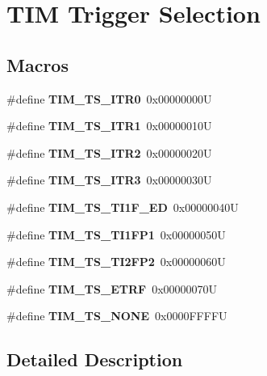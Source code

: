 \hypertarget{group___t_i_m___trigger___selection}{}\section{T\+IM Trigger Selection}
\label{group___t_i_m___trigger___selection}
\subsection*{Macros}
\begin{DoxyCompactItemize}
\item 
\mbox{\label{group___t_i_m___trigger___selection_gab7cf2b7db3956d4fd1e5a5d84f4891e7}} 
\#define {\bfseries T\+I\+M\+\_\+\+T\+S\+\_\+\+I\+T\+R0}~0x00000000U
\item 
\mbox{\label{group___t_i_m___trigger___selection_gad90fbca297153ca9c0112a67ea2c6cb3}} 
\#define {\bfseries T\+I\+M\+\_\+\+T\+S\+\_\+\+I\+T\+R1}~0x00000010U
\item 
\mbox{\label{group___t_i_m___trigger___selection_ga8599ba58a5f911d648503c7ac55d4320}} 
\#define {\bfseries T\+I\+M\+\_\+\+T\+S\+\_\+\+I\+T\+R2}~0x00000020U
\item 
\mbox{\label{group___t_i_m___trigger___selection_ga63183e611b91c5847040172c0069514d}} 
\#define {\bfseries T\+I\+M\+\_\+\+T\+S\+\_\+\+I\+T\+R3}~0x00000030U
\item 
\mbox{\label{group___t_i_m___trigger___selection_ga8c89554efc693e679c94b5a749af123c}} 
\#define {\bfseries T\+I\+M\+\_\+\+T\+S\+\_\+\+T\+I1\+F\+\_\+\+ED}~0x00000040U
\item 
\mbox{\label{group___t_i_m___trigger___selection_ga38d3514d54bcdb0ea8ac8bd91c5832b5}} 
\#define {\bfseries T\+I\+M\+\_\+\+T\+S\+\_\+\+T\+I1\+F\+P1}~0x00000050U
\item 
\mbox{\label{group___t_i_m___trigger___selection_ga0ed58a269bccd3f22d19cc9a2ba3123f}} 
\#define {\bfseries T\+I\+M\+\_\+\+T\+S\+\_\+\+T\+I2\+F\+P2}~0x00000060U
\item 
\mbox{\label{group___t_i_m___trigger___selection_gaece08e02e056613a882aa7ff0a6ccc2d}} 
\#define {\bfseries T\+I\+M\+\_\+\+T\+S\+\_\+\+E\+T\+RF}~0x00000070U
\item 
\mbox{\label{group___t_i_m___trigger___selection_ga257bee9dc9f2f71a73124dd8c2329480}} 
\#define {\bfseries T\+I\+M\+\_\+\+T\+S\+\_\+\+N\+O\+NE}~0x0000\+F\+F\+F\+FU
\end{DoxyCompactItemize}


\subsection{Detailed Description}
